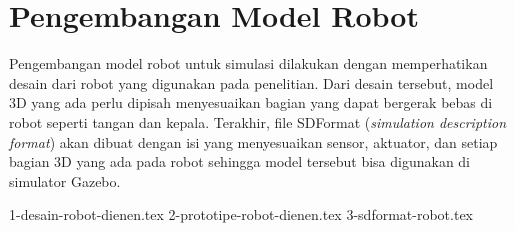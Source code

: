 \section{Pengembangan Model Robot}
\label{sec:modelrobot}

Pengembangan model robot untuk simulasi dilakukan dengan memperhatikan desain dari robot yang digunakan pada penelitian.
Dari desain tersebut, model 3D yang ada perlu dipisah menyesuaikan bagian yang dapat bergerak bebas di robot seperti tangan dan kepala.
Terakhir, file SDFormat (\emph{simulation description format}) akan dibuat dengan isi yang menyesuaikan sensor, aktuator, dan setiap bagian 3D yang ada pada robot sehingga model tersebut bisa digunakan di simulator Gazebo.

{1-desain-robot-dienen.tex}
{2-prototipe-robot-dienen.tex}
{3-sdformat-robot.tex}
